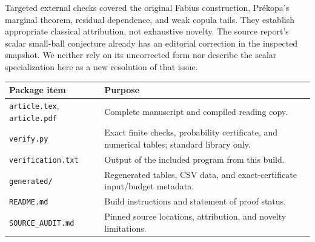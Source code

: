 \documentclass[11pt,a4paper]{article}
\theoremstyle{definition}
\theoremstyle{remark}
\numberwithin{equation}{section}
\begin{document}
Targeted external checks covered the original Fabius construction,
Pr\'ekopa's marginal theorem, residual dependence, and weak copula tails.
They establish appropriate classical attribution, not exhaustive novelty.
The source report's scalar small-ball conjecture already has an editorial
correction in the inspected snapshot. We neither rely on its uncorrected
form nor describe the scalar specialization here as a new resolution of
that issue.

\begin{center}
\begin{tabular}{p{}p{}}
\toprule
Package item & Purpose\\
\midrule
\texttt{article.tex}, \texttt{article.pdf} & Complete manuscript and compiled
reading copy.\\[1mm]
\texttt{verify.py} & Exact finite checks, probability certificate, and
numerical tables; standard library only.\\[1mm]
\texttt{verification.txt} & Output of the included program from this build.\\[1mm]
\texttt{generated/} & Regenerated tables, CSV data, and exact-certificate
input/budget metadata.\\[1mm]
\texttt{README.md} & Build instructions and statement of proof status.\\[1mm]
\texttt{SOURCE\_AUDIT.md} & Pinned source locations, attribution, and novelty
limitations.\\
\bottomrule
\end{tabular}
\end{center}
\end{document}
